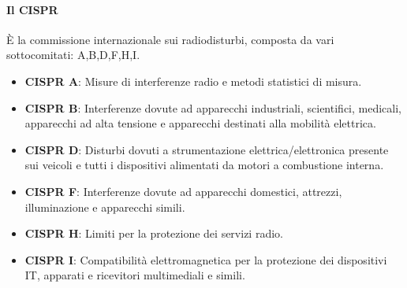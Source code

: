 \paragraph{Il CISPR} È la commissione internazionale sui radiodisturbi, composta da vari sottocomitati: A,B,D,F,H,I.
\begin{itemize}
 \item \textbf{CISPR A}: Misure di interferenze radio e metodi statistici di misura.
 \item \textbf{CISPR B}: Interferenze dovute ad apparecchi industriali, scientifici, medicali, apparecchi ad alta tensione e
 apparecchi destinati alla mobilità elettrica.
 \item \textbf{CISPR D}: Disturbi dovuti a strumentazione elettrica/elettronica presente sui veicoli e tutti i dispositivi
 alimentati da motori a combustione interna.
 \item \textbf{CISPR F}: Interferenze dovute ad apparecchi domestici, attrezzi, illuminazione e apparecchi simili.
 \item \textbf{CISPR H}: Limiti per la protezione dei servizi radio.
 \item \textbf{CISPR I}: Compatibilità elettromagnetica per la protezione dei dispositivi IT, apparati e ricevitori 
 multimediali e simili.
\end{itemize}



